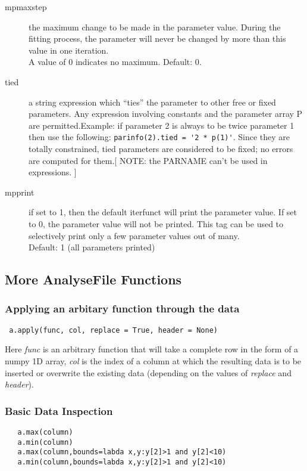 \documentclass[a4paper,11pt]{scrartcl}
\begin{document}
\begin{description}
  \item[mpmaxstep] the maximum change to be made in the parameter value.  During
the fitting process, the parameter will never be changed by more than this value
in one iteration.\\ A value of 0 indicates no maximum.  Default: 0.
  \item[tied] a string expression which ``ties'' the parameter to other	free or
fixed parameters.  Any expression involving	constants and the parameter
array P are permitted.Example: if parameter 2 is always to be twice parameter 1
then use the following: \verb#parinfo(2).tied = '2 * p(1)'#. Since they are
totally constrained, tied parameters are considered to be fixed; no errors are
computed for them.[ NOTE: the PARNAME can't be used in expressions. ]
  \item[mpprint] if set to 1, then the default iterfunct will print the
parameter value.  If set to 0, the parameter value will not be printed.  This
tag can be used to selectively print only a few parameter values out of
many.\\Default: 1 (all parameters printed)
\end{description}

\subsection{More AnalyseFile Functions}

\subsubsection{Applying an arbitary function through the data}

\begin{lstlisting}
 a.apply(func, col, replace = True, header = None)
\end{lstlisting}

Here \textit{func} is an arbitrary function that will take a complete row in the form of a numpy 1D array, \textit{col}
is the index of a column at which the resulting data is to be inserted or overwrite the existing data (depending on the values of \textit{replace} and \textit{header}).


\subsubsection{Basic Data Inspection}
\begin{lstlisting}
   a.max(column)
   a.min(column)
   a.max(column,bounds=labda x,y:y[2]>1 and y[2]<10)
   a.min(column,bounds=labda x,y:y[2]>1 and y[2]<10)
\end{lstlisting}
\end{document}
